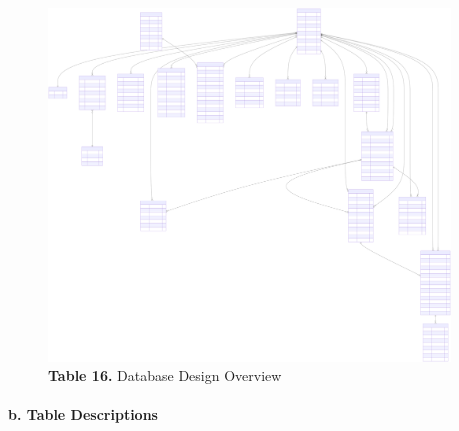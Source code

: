 \documentclass[12pt,a4paper]{article}
\begin{document}
\begin{figure}[H]
    \centering
    \includegraphics[width=0.95\textwidth]{diagrams/database_schema_erd.svg}
    \caption*{\textbf{Table 16.} Database Design Overview}
\end{figure}



\paragraph{b. Table Descriptions}
\end{document}
